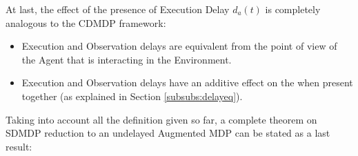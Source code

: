                 At last, the effect of the presence of Execution Delay $d_a(t)$ is completely analogous to the CDMDP framework: 
                \begin{itemize}[topsep=0.5em, partopsep=0.5em]
                    \setlength\itemsep{0em}
                    \item Execution and Observation delays are equivalent from the point of view of the Agent that is interacting in the Environment.
                    \item Execution and Observation delays have an additive effect on the when present together (as explained in Section \ref{subsubs:delayeq}).
                \end{itemize}
                Taking into account all the definition given so far, a complete theorem on SDMDP reduction to an undelayed Augmented MDP can be stated as a last result:
